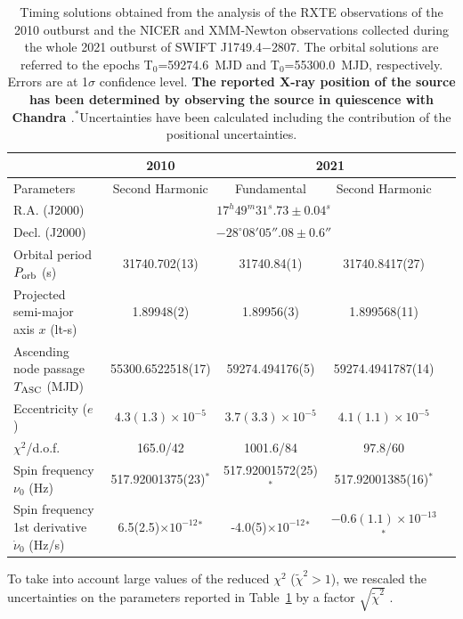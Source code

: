 \documentclass[fleqn,usenatbib]{mnras}
\newcommand{\swiftj}{SWIFT J1749.4$-$2807}
\newcommand{\nicer}{NICER}
\newcommand{\xmm}{XMM-Newton}
\newcommand{\rxte}{RXTE}
\newcommand{\chandra}{Chandra}
\begin{document}
\begin{table}

\begin{tabular}{l | c  c  c  c}
\hline
&  2010 & \multicolumn{2}{c}{2021} \\
\hline
Parameters   &    Second Harmonic      & Fundamental & Second Harmonic\\
\hline
\hline
R.A. (J2000) &  \multicolumn{3}{c}{$17^h49^m31^s.73\pm0.04^s\!$}\\
Decl. (J2000) & \multicolumn{3}{c}{$-28^\circ08'05''.08\pm0.6''$} \\
Orbital period $P_{\rm orb}$ (s) & 31740.702(13) & 31740.84(1) & 31740.8417(27)\\
Projected semi-major axis $x$ (lt-s) & 1.89948(2) & 1.89956(3) &1.899568(11) \\
Ascending node passage $T_{{\rm ASC}}$ (MJD) & 55300.6522518(17) & 59274.494176(5) & 59274.4941787(14)\\
Eccentricity ($e$) & $4.3(1.3)\times 10^{-5}$ & $3.7(3.3)\times 10^{-5}$ &$4.1(1.1)\times 10^{-5}$\\
$\chi^2$/d.o.f. & 165.0/42 & 1001.6/84 & 97.8/60\\
\hline
\hline
Spin frequency $\nu_0$ (Hz) & 517.92001375(23)$^*$ &517.92001572(25)$^*$& 517.92001385(16)$^*$\\
Spin frequency 1st derivative $\dot{\nu}_0$ (Hz/s) & 6.5(2.5)$\times 10^{-12}$$^*$ &-4.0(5)$\times 10^{-12}$$^*$&$-0.6(1.1)\times 10^{-13}$$^*$\\
\hline
\end{tabular}
\caption{Timing solutions obtained from the analysis of the \rxte{} observations of the 2010 outburst and the \nicer{} and \xmm{} observations collected during the whole 2021 outburst of \swiftj{}. The orbital solutions are  referred to the epochs T$_0$=59274.6~MJD and T$_0$=55300.0~MJD, respectively. Errors are at 1$\sigma$ confidence level. \textbf{The reported X-ray position of the source has been determined by observing the source in quiescence with \chandra{} \citep{Jonker:2013wp}}.$^*$Uncertainties have been calculated including the contribution of the positional uncertainties.}
\label{tab:solution}
\end{table}

To take into account large values of the reduced $\chi^2$ ($\tilde{\chi}^2>1$), we rescaled the uncertainties on the parameters reported in Table~\ref{tab:solution} by a factor $\sqrt{\tilde{\chi}^2}$ \citep[see e.g.,][]{Finger:1999vb}.
\end{document}
